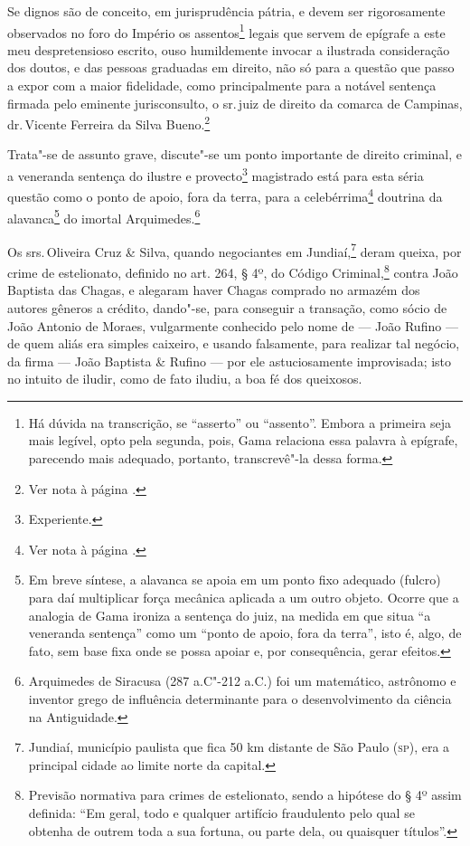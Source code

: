 \setcounter{footnote}{1}
  \setcounter{footnote}{2}

\noindent{}Se dignos são de conceito, em jurisprudência pátria, e devem ser
rigorosamente observados no foro do Império os assentos\footnote{Há
  dúvida na transcrição, se ``asserto'' ou ``assento''. Embora a primeira
  seja mais legível, opto pela segunda, pois, Gama relaciona essa
  palavra à epígrafe, parecendo mais adequado, portanto, transcrevê"-la
  dessa forma.} legais que servem de epígrafe a este meu
despretensioso escrito, ouso humildemente invocar a ilustrada
consideração dos doutos, e das pessoas graduadas em direito, não só para
a questão que passo a expor com a maior fidelidade, como principalmente
para a notável sentença firmada pelo eminente jurisconsulto, o sr.\,juiz
de direito da comarca de Campinas, dr.\,Vicente Ferreira da Silva
Bueno.\footnote{Ver nota à página \pageref{bueno}.}

Trata"-se de assunto grave, discute"-se um ponto importante de direito
criminal, e a veneranda sentença do ilustre e provecto\footnote{
  Experiente.} magistrado está para esta séria questão como o ponto de
apoio, fora da terra, para a celebérrima\footnote{Ver nota à página \pageref{celebre}.} doutrina da alavanca\footnote{
  Em breve síntese, a alavanca se apoia em um ponto fixo adequado
  (fulcro) para daí multiplicar força mecânica aplicada a um outro
  objeto. Ocorre que a analogia de Gama ironiza a sentença do juiz, na
  medida em que situa ``a veneranda sentença'' como um ``ponto de apoio,
  fora da terra'', isto é, algo, de fato, sem base fixa onde se possa
  apoiar e, por consequência, gerar efeitos.} do imortal
Arquimedes.\footnote{Arquimedes de Siracusa (287 a.C"-212 a.C.) foi um
  matemático, astrônomo e inventor grego de influência determinante para
  o desenvolvimento da ciência na Antiguidade.}

\asterisc

Os srs.\,Oliveira Cruz \& Silva, quando negociantes em Jundiaí,\footnote{
  Jundiaí, município paulista que fica 50 km distante de São Paulo (\textsc{sp}),
  era a principal cidade ao limite norte da capital.} deram queixa, por
crime de estelionato, definido no art. 264, § 4º, do Código
Criminal,\footnote{Previsão normativa para crimes de estelionato,
  sendo a hipótese do § 4º assim definida: ``Em geral, todo e qualquer
  artifício fraudulento pelo qual se obtenha de outrem toda a sua
  fortuna, ou parte dela, ou quaisquer títulos''.} contra João Baptista
das Chagas, e alegaram haver Chagas comprado no armazém dos autores
gêneros a crédito, dando"-se, para conseguir a transação, como sócio de
João Antonio de Moraes, vulgarmente conhecido pelo nome de --- João
Rufino --- de quem aliás era simples caixeiro, e usando falsamente,
para realizar tal negócio, da firma --- João Baptista \& Rufino ---
por ele astuciosamente improvisada; isto no intuito de iludir, como de
fato iludiu, a boa fé dos queixosos.

